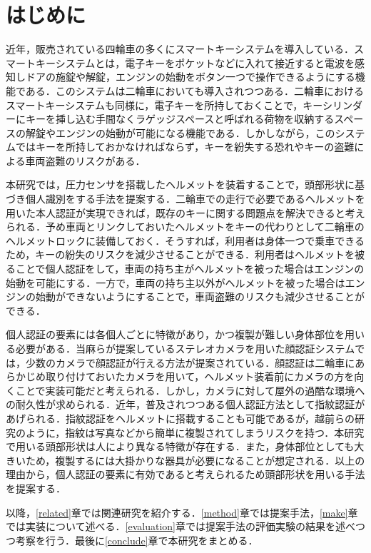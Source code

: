 \documentclass[Japanese,noauthor]{dicomopapers}
\begin{document}
\section{はじめに}
\label{introduction}
近年，販売されている四輪車の多くにスマートキーシステムを導入している．スマートキーシステムとは，電子キーをポケットなどに入れて接近すると電波を感知しドアの施錠や解錠，エンジンの始動をボタン一つで操作できるようにする機能である．このシステムは二輪車においても導入されつつある．二輪車におけるスマートキーシステムも同様に，電子キーを所持しておくことで，キーシリンダーにキーを挿し込む手間なくラゲッジスペースと呼ばれる荷物を収納するスペースの解錠やエンジンの始動が可能になる機能である．しかしながら，このシステムではキーを所持しておかなければならず，キーを紛失する恐れやキーの盗難による車両盗難のリスクがある．\par
本研究では，圧力センサを搭載したヘルメットを装着することで，頭部形状に基づき個人識別をする手法を提案する．二輪車での走行で必要であるヘルメットを用いた本人認証が実現できれば，既存のキーに関する問題点を解決できると考えられる．予め車両とリンクしておいたヘルメットをキーの代わりとして二輪車のヘルメットロックに装備しておく．そうすれば，利用者は身体一つで乗車できるため，キーの紛失のリスクを減少させることができる．利用者はヘルメットを被ることで個人認証をして，車両の持ち主がヘルメットを被った場合はエンジンの始動を可能にする．一方で，車両の持ち主以外がヘルメットを被った場合はエンジンの始動ができないようにすることで，車両盗難のリスクも減少させることができる．\par
個人認証の要素には各個人ごとに特徴があり，かつ複製が難しい身体部位を用いる必要がある．当麻ら\cite{face}が提案しているステレオカメラを用いた顔認証システムでは，少数のカメラで顔認証が行える方法が提案されている．顔認証は二輪車にあらかじめ取り付けておいたカメラを用いて，ヘルメット装着前にカメラの方を向くことで実装可能だと考えられる．しかし，カメラに対して屋外の過酷な環境への耐久性が求められる．近年，普及されつつある個人認証方法として指紋認証があげられる．指紋認証をヘルメットに搭載することも可能であるが，越前ら\cite{finger_print}の研究のように，指紋は写真などから簡単に複製されてしまうリスクを持つ．本研究で用いる頭部形状は人により異なる特徴が存在する．また，身体部位としても大きいため，複製するには大掛かりな器具が必要になることが想定される．以上の理由から，個人認証の要素に有効であると考えられるため頭部形状を用いる手法を提案する．\par
以降，\ref{related}章では関連研究を紹介する．\ref{method}章では提案手法，\ref{make}章では実装について述べる．\ref{evaluation}章では提案手法の評価実験の結果を述べつつ考察を行う．最後に\ref{conclude}章で本研究をまとめる．
\end{document}
